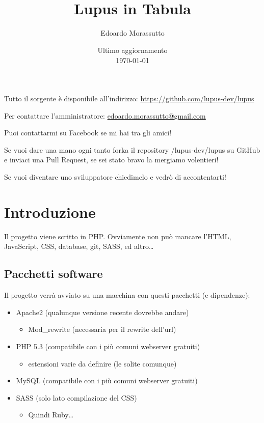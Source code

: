 \documentclass[10pt,a4paper]{article}
\title{
\horrule{0.5pt} \\[0.5cm]
\huge Lupus in Tabula
\horrule{0.5pt}
}
\author{
{\Large Edoardo Morassutto}
}
\date{
{\small Ultimo aggiornamento} \\
\today
}
\newcommand{\mail}[1]{\href{mailto:#1}{#1}}
\begin{document}
\maketitle

Tutto il sorgente è disponibile all'indirizzo: \url{https://github.com/lupus-dev/lupus}

Per contattare l'amministratore: \mail{edoardo.morassutto@gmail.com}

Puoi contattarmi su Facebook se mi hai tra gli amici!

Se vuoi dare una mano ogni tanto forka il repository /lupus-dev/lupus su GitHub e inviaci una Pull Request, se sei stato bravo la mergiamo volentieri!

Se vuoi diventare uno sviluppatore chiedimelo e vedrò di accontentarti!

\section{Introduzione}
Il progetto viene scritto in PHP. Ovviamente non può mancare l'HTML, JavaScript, CSS, database, git, SASS, ed altro\dots

\subsection{Pacchetti software}
Il progetto verrà avviato su una macchina con questi pacchetti (e dipendenze):
\begin{itemize}
\item Apache2 (qualunque versione recente dovrebbe andare)
	\begin{itemize}
	\item Mod\_rewrite (necessaria per il rewrite dell'url)
	\end{itemize}
\item PHP 5.3 (compatibile con i più comuni webserver gratuiti)
	\begin{itemize}
	\item estensioni varie da definire (le solite comunque)
	\end{itemize}
\item MySQL (compatibile con i più comuni webserver gratuiti)
\item SASS (solo lato compilazione del CSS)
	\begin{itemize}	
	\item Quindi Ruby\dots
	\end{itemize}
\end{itemize}
\end{document}

